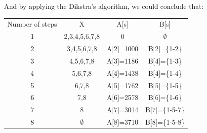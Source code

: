 \documentclass[a4paper,12pt]{journal}
\begin{document}
	And by applying the Dikstra's algorithm, we could conclude that:
	\begin{center}
		\begin{tabular}{c c c c}
			Number of steps&X&A[s]&B[s]\\
			1&2,3,4,5,6,7,8&0&$\emptyset$\\
			2&3,4,5,6,7,8&A[2]=1000&B[2]=\{1-2\}\\
			3&4,5,6,7,8&A[3]=1186&B[4]=\{1-3\}\\
			4&5,6,7,8&A[4]=1438&B[4]=\{1-4\}\\
			5&6,7,8&A[5]=1762&B[5]=\{1-5\}\\
			6&7,8&A[6]=2578&B[6]=\{1-6\}\\
			7&8&A[7]=3014&B[7]=\{1-5-7\}\\
			8&$\emptyset$&A[8]=3710&B[8]=\{1-5-8\}\\
		\end{tabular}
	\end{center}
\end{document}
